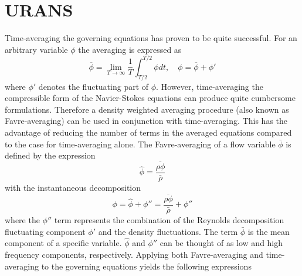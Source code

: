 
\section{URANS}
Time-averaging the governing equations has proven to be quite successful. For an arbitrary variable $\phi$ the averaging is expressed as
\begin{equation}
  \overline{\phi} = \lim\limits_{T \to \infty}\frac{1}{T}\int ^{T/2} _{T/2} \phi dt, \quad \phi = \overline{\phi}+\phi'
\end{equation}
where $\phi'$ denotes the fluctuating part of $\phi$. However, time-averaging the compressible form of the Navier-Stokes equations can produce quite cumbersome formulations. Therefore a density weighted averaging procedure (also known as Favre-averaging\cite{Favre1969}) can be used in conjunction with time-averaging. This has the advantage of reducing the number of terms in the averaged equations compared to the case for time-averaging alone. The Favre-averaging of a flow variable $\bar{\phi}$ is defined by the expression
\begin{equation}
  \hat{\phi} = \frac{\overline{\rho \phi}}{\bar{\rho}}
\end{equation}
with the instantaneous decomposition 
\begin{equation}
  \phi = \hat{\phi}+\phi'' = \frac{\overline{\rho \phi}}{\bar{\rho}}+\phi''
\end{equation}
where the $\phi''$ term represents the combination of the Reynolds decomposition fluctuating component $\phi'$ and the density fluctuations. The term $\bar{\phi}$ is the mean component of a specific variable. $\hat{\phi}$ and $\phi''$ can be thought of as low and high frequency components, respectively.
Applying both Favre-averaging and time-averaging to the governing equations yields the following expressions
